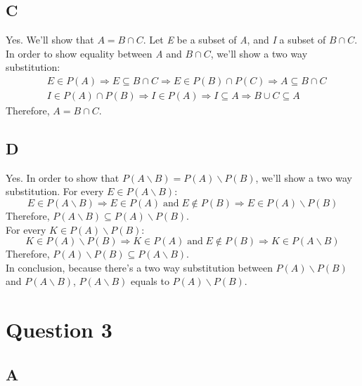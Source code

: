 \documentclass[12pt, oneside]{article}
\begin{document}
\subsection{C}
Yes. We'll show that $A = B \cap C$. Let \emph{E} be a subset of \emph{A}, and \emph{I} a subset of $B \cap C$. In order to show equality between \emph{A} and $B \cap C$, we'll show a two way substitution:
\begin{equation*}
\begin{split}
& E \in P(A) \Rightarrow E \subseteq B \cap C \Rightarrow E \in P(B) \cap P(C) \Rightarrow A \subseteq B \cap C\\
& I \in P(A) \cap P(B) \Rightarrow I \in P(A) \Rightarrow I \subseteq A \Rightarrow B \cup C \subseteq A
\end{split}
\end{equation*}
Therefore, $A = B \cap C$.

\subsection{D}
Yes. In order to show that $P(A \backslash B) = P(A) \backslash P(B)$, we'll show a two way substitution.
For every $E \in P(A \backslash B)$:
\begin{equation*}
E \in P(A \backslash B) \Rightarrow E \in P(A)\;\text{and}\;E \not\in P(B) \Rightarrow E \in P(A) \backslash P(B)
\end{equation*}
Therefore, $P(A \backslash B) \subseteq P(A) \backslash P(B)$.\\
\hfill\newline
For every $K \in P(A) \backslash P(B)$:
\begin{equation*}
K \in P(A) \backslash P(B) \Rightarrow K \in P(A)\;\text{and}\;E \not\in P(B) \Rightarrow K \in P(A \backslash B)
\end{equation*}
Therefore, $P(A) \backslash P(B) \subseteq P(A \backslash B)$.\\
\hfill\newline
In conclusion, because there's a two way substitution between $P(A) \backslash P(B)$ and $P(A \backslash B)$, $P(A \backslash B)$ equals to $P(A) \backslash P(B)$.
\clearpage

\section{Question 3}
\subsection{A}
\setcounter{subsubsection}{-1}
\end{document}
